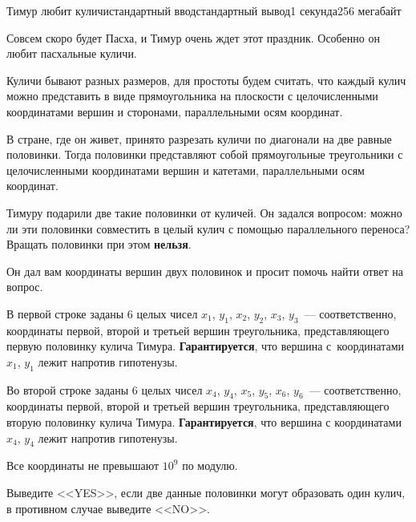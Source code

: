 \begin{problem}{Тимур любит куличи}{стандартный ввод}{стандартный вывод}{1 секунда}{256 мегабайт}

Совсем скоро будет Пасха, и Тимур очень ждет этот праздник. Особенно он любит пасхальные куличи.

Куличи бывают разных размеров, для простоты будем считать, что каждый кулич можно представить в виде прямоугольника на плоскости с целочисленными координатами вершин и сторонами, параллельными осям координат.

В стране, где он живет, принято разрезать куличи по диагонали на две равные половинки. Тогда половинки представляют собой прямоугольные треугольники с целочисленными координатами вершин и катетами, параллельными осям координат.

Тимуру подарили две такие половинки от куличей. Он задался вопросом: можно ли эти половинки совместить в целый кулич с помощью параллельного переноса? Вращать половинки при этом \textbf{нельзя}.

Он дал вам координаты вершин двух половинок и просит помочь найти ответ на вопрос.

\InputFile
В первой строке заданы 6 целых чисел $x_1$, $y_1$, $x_2$, $y_2$, $x_3$, $y_3$~--- соответственно, координаты первой, второй и третьей вершин треугольника, представляющего первую половинку кулича Тимура. \textbf{Гарантируется}, что вершина с~координатами $x_1$, $y_1$ лежит напротив гипотенузы.

Во второй строке заданы 6 целых чисел $x_4$, $y_4$, $x_5$, $y_5$, $x_6$, $y_6$~--- соответственно, координаты первой, второй и третьей вершин треугольника, представляющего вторую половинку кулича Тимура. \textbf{Гарантируется}, что вершина с координатами $x_4$, $y_4$ лежит напротив гипотенузы.

Все координаты не превышают $10^9$ по модулю.

\OutputFile
Выведите <<YES>>, если две данные половинки могут образовать один кулич, в противном случае выведите <<NO>>.

\Examples

\begin{example}
%
%
\end{example}

\end{problem}

